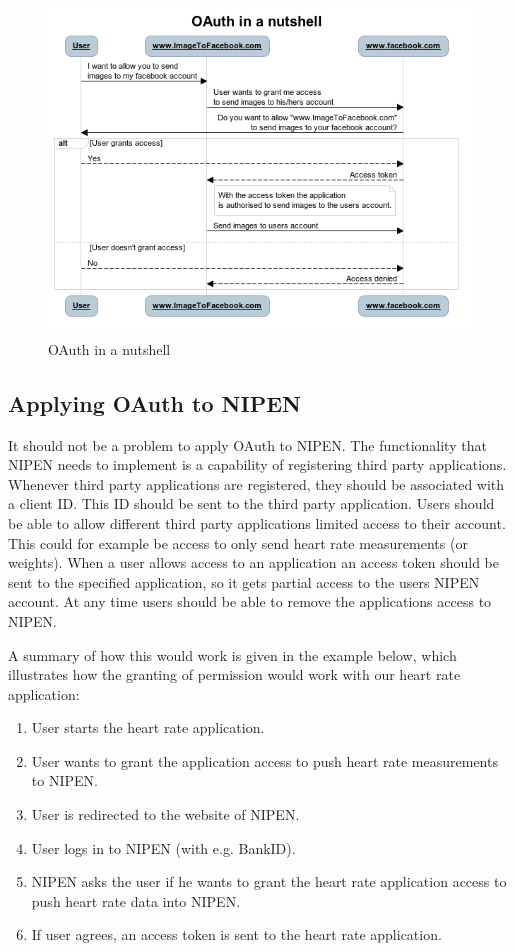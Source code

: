 \begin{figure}[h]
\centering
\includegraphics[scale=1.0]{../Figures/oauth-in-a-nutshell.png}
\caption{OAuth in a nutshell}
\label{figure:oauth-in-a-nutshell}
\end{figure}

\iffalse
\subsection{Applying OAuth to NIPEN}

It should not be a problem to apply OAuth to NIPEN.
The functionality that NIPEN needs to implement is a capability of registering third party applications.
Whenever third party applications are registered, they should be associated with a client ID.
This ID should be sent to the third party application.
Users should be able to allow different third party applications limited access to their account.
This could for example be access to only send heart rate measurements (or weights).
When a user allows access to an application an access token should be sent to the specified application, so it gets partial access to the users NIPEN account.
At any time users should be able to remove the applications access to NIPEN.

A summary of how this would work is given in the example below, which illustrates how the granting of permission would work with our heart rate application:

\begin{enumerate}
\item User starts the heart rate application.
\item User wants to grant the application access to push heart rate measurements to NIPEN.
\item User is redirected to the website of NIPEN.
\item User logs in to NIPEN (with e.g. BankID).
\item NIPEN asks the user if he wants to grant the heart rate application access to push heart rate data into NIPEN.
\item If user agrees, an access token is sent to the heart rate application.
\end{enumerate}

